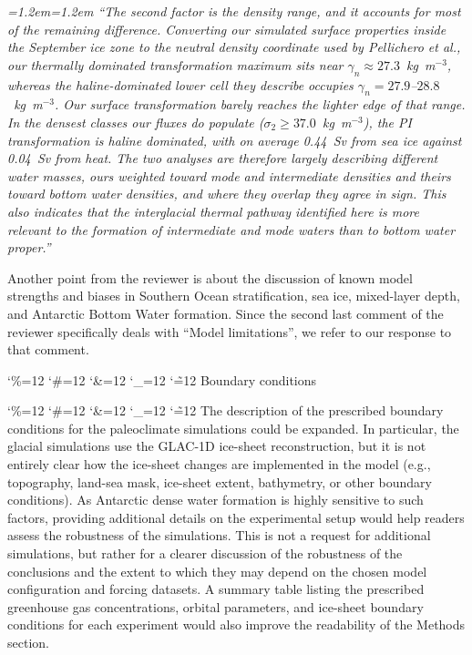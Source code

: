 \documentclass[11pt,a4paper]{article}
\newcommand{\comment}[1]{\par\medskip\noindent\color{black}\begingroup\catcode`\%=12 \catcode`\#=12 \catcode`\&=12 \catcode`\_=12 \catcode`\~=12 \commentbody}
\newcommand{\commentbody}[1]{#1\endgroup\par\smallskip}
\newenvironment{change}{\par\smallskip\color{chgcol}\small\itshape\leftskip=1.2em\rightskip=1.2em\noindent\ignorespaces}{\par\smallskip}
\begin{document}
\begin{change}
``The second factor is the density range, and it accounts for most of the remaining difference. Converting our simulated surface properties inside the September ice zone to the neutral density coordinate used by Pellichero et al., our thermally dominated transformation maximum sits near $\gamma_n \approx 27.3$~kg~m$^{-3}$, whereas the haline-dominated lower cell they describe occupies $\gamma_n = 27.9$--$28.8$~kg~m$^{-3}$. Our surface transformation barely reaches the lighter edge of that range. In the densest classes our fluxes do populate ($\sigma_2 \ge 37.0$~kg~m$^{-3}$), the PI transformation is haline dominated, with on average 0.44~Sv from sea ice against 0.04~Sv from heat. The two analyses are therefore largely describing different water masses, ours weighted toward mode and intermediate densities and theirs toward bottom water densities, and where they overlap they agree in sign. This also indicates that the interglacial thermal pathway identified here is more relevant to the formation of intermediate and mode waters than to bottom water proper.''
\end{change}

Another point from the reviewer is about the discussion of known model strengths and biases in Southern Ocean stratification, sea ice, mixed-layer depth, and Antarctic Bottom Water formation. Since the second last comment of the reviewer specifically deals with ``Model limitations'', we refer to our response to that comment.



\comment{R1}{Boundary conditions}

\comment{R1}{The description of the prescribed boundary conditions for the paleoclimate simulations could be expanded. In particular, the glacial simulations use the GLAC-1D ice-sheet reconstruction, but it is not entirely clear how the ice-sheet changes are implemented in the model (e.g., topography, land-sea mask, ice-sheet extent, bathymetry, or other boundary conditions). As Antarctic dense water formation is highly sensitive to such factors, providing additional details on the experimental setup would help readers assess the robustness of the simulations. This is not a request for additional simulations, but rather for a clearer discussion of the robustness of the conclusions and the extent to which they may depend on the chosen model configuration and forcing datasets. A summary table listing the prescribed greenhouse gas concentrations, orbital parameters, and ice-sheet boundary conditions for each experiment would also improve the readability of the Methods section.}
\end{document}
